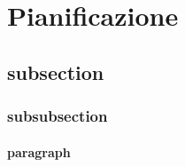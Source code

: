\section{Pianificazione}


\subsection{subsection}


\subsubsection{subsubsection}


\paragraph{paragraph}


\newpage